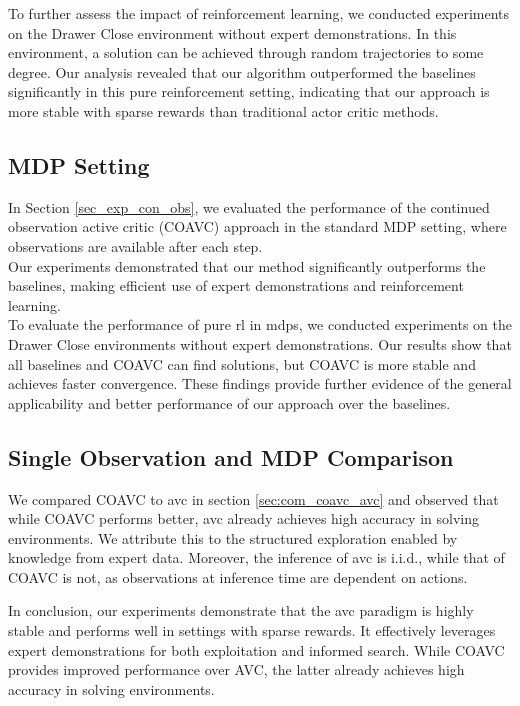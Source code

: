 To further assess the impact of reinforcement learning, we conducted experiments on the Drawer Close environment without expert demonstrations. 
In this environment, a solution can be achieved through random trajectories to some degree. 
Our analysis revealed that our algorithm outperformed the baselines significantly in this pure reinforcement setting, 
indicating that our approach is more stable with sparse rewards than traditional actor critic methods.\\




\subsection{MDP Setting}
In Section \ref{sec_exp_con_obs}, we evaluated the performance of the continued observation active critic (COAVC) approach in the standard MDP setting, 
where observations are available after each step.\\

Our experiments demonstrated that our method significantly outperforms the baselines, making efficient use of expert demonstrations and reinforcement learning.\\

To evaluate the performance of pure \ac{rl} in \ac{mdp}s, we conducted experiments on the Drawer Close 
environments without expert demonstrations. Our results show that all baselines and COAVC can find solutions, but COAVC is more stable and achieves 
faster convergence. These findings provide further evidence of the general applicability and better performance of our approach over the baselines. 

\subsection{Single Observation and MDP Comparison}
We compared COAVC to \ac{avc} in section \ref{sec:com_coavc_avc} and observed that while COAVC performs better, 
\ac{avc} already achieves high accuracy in solving environments. We attribute this to the structured exploration enabled by knowledge from 
expert data. Moreover, the inference of \ac{avc} is i.i.d., while that of COAVC is not, as observations at inference time are dependent on actions. 

In conclusion, our experiments demonstrate that the \ac{avc} paradigm is highly stable and performs well in settings with sparse rewards. 
It effectively leverages expert demonstrations for both exploitation and informed search. While COAVC provides improved performance over 
AVC, the latter already achieves high accuracy in solving environments.

